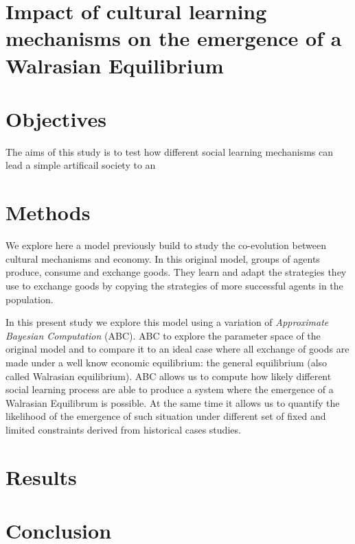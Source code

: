 \documentclass[a4paper,10pt]{report}
\begin{document}
\section*{Impact of cultural learning mechanisms on the emergence of a Walrasian Equilibrium}

\section{Objectives}
The aims of this study is to test how different social learning mechanisms can lead a simple artificail society to an 

\section{Methods}
We explore here a model previously build to study the co-evolution between cultural mechanisms and economy. In this original model, groups of agents produce, consume and exchange goods. They learn and adapt the strategies they use to exchange goods by copying the strategies of more successful agents in the population.

In this present study we explore this model using a variation of \emph{Approximate Bayesian Computation} (ABC). ABC  to explore the parameter space of the original model and to compare it to an ideal case where all exchange of goods are made under a well  know economic equilibrium: the  general equilibrium (also called Walrasian equilibrium). ABC allows us to compute how likely different social learning process are able to produce a system where the emergence of a Walrasian Equilibrum is possible. At the same time it allows us to quantify the likelihood of the emergence of such situation under different set of fixed and limited constraints derived from historical cases studies.

\section{Results}

\section{Conclusion}
\end{document}

